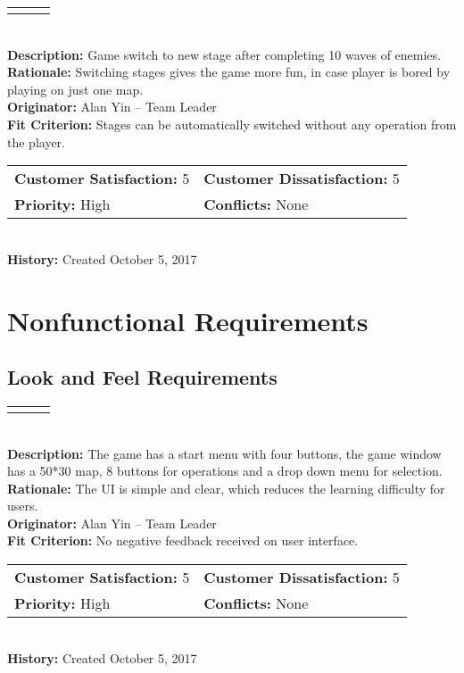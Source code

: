 \documentclass[12pt]{article}
\begin{document}
\begin{reqbox}
\color{red}
\begin{tabular}{ccc}\color{red}{Requirement: FR05}
\end{tabular} \\

\textbf{Description:} Game switch to new stage after completing 10 waves of enemies.\\
\textbf{Rationale:} Switching stages gives the game more fun, in case player is bored by playing on just one map.\\
\textbf{Originator:} Alan Yin -- Team Leader \\
\textbf{Fit Criterion:} Stages can be automatically switched without any operation from the player.\\
\begin{tabular}{ll}
\textbf{Customer Satisfaction:} 5 & \textbf{Customer Dissatisfaction:} 5 \\
\textbf{Priority:} High & \textbf{Conflicts:} None\\
\end{tabular} \\
\textbf{History:} Created October 5, 2017
\end{reqbox}
\color{black}


\section{Nonfunctional Requirements}


\subsection{Look and Feel Requirements}
\begin{reqbox}
\begin{tabular}{ccc}\color{red}{Requirement: UFR01}
\end{tabular} \\
\textbf{Description:} The game has a start menu with four buttons, the game window has a 50*30 map, 8 buttons for operations and a drop down menu for selection.\\
\textbf{Rationale:} The UI is simple and clear, which reduces the learning difficulty for users.\\
\textbf{Originator:} Alan Yin -- Team Leader \\
\textbf{Fit Criterion:} No negative feedback received on user interface.\\
\begin{tabular}{ll}
\textbf{Customer Satisfaction:} 5 & \textbf{Customer Dissatisfaction:} 5 \\
\textbf{Priority:} High & \textbf{Conflicts:} None\\
\end{tabular} \\
\textbf{History:} Created October 5, 2017
\end{reqbox}
\end{document}
